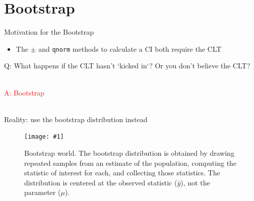 \documentclass[handout]{beamer}\usepackage[]{graphicx}\usepackage[]{color}
\newcommand {\framedgraphiccaption}[2] {
	\begin{figure}
		\centering
		\texttt{[image: \#1]}
		\caption{#2}
	\end{figure}
}
\begin{document}
\section{Bootstrap}

\begin{frame}{Motivation for the Bootstrap}
\begin{itemize}
	\setlength\itemsep{2em}
	\item The $\pm$ and \texttt{qnorm} methods to calculate a CI both require the CLT
\end{itemize}


\vspace*{0.2in}

\Large \textcolor{myblue}{Q: What happens if the CLT hasn't `kicked in`? Or you don't believe the CLT?} \\ \ \\

\pause 

\Large \textcolor{red}{A: Bootstrap} \\ \ \\
\end{frame}



\begin{frame}[fragile]{Reality: use the bootstrap distribution instead}




\framedgraphiccaption{../bootstrap/boot_diag.pdf}{\scriptsize{Bootstrap world. The bootstrap distribution is obtained by drawing repeated samples from an estimate of the population, computing the statistic of interest for each, and collecting those statistics. The distribution is centered at the observed statistic ($\bar{y}$), not the parameter ($\mu$).}}

\end{frame}
\end{document}

